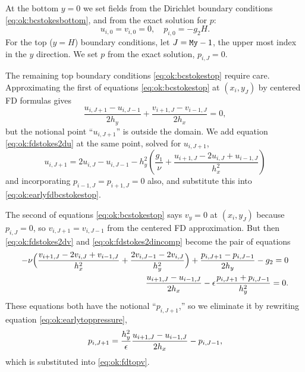 At the bottom $y=0$ we set fields from the Dirichlet boundary conditions \eqref{eq:ok:bcstokesbottom}, and from the exact solution for $p$:
\begin{equation}
  u_{i,0} = v_{i,0} = 0, \quad p_{i,0} = - g_2 H. \label{eq:ok:fdbcstokesbottom}
\end{equation}
For the top ($y=H$) boundary conditions, let $J=\text{\texttt{My}}-1$, the upper most index in the $y$ direction.  We set $p$ from the exact solution, $p_{i,J} = 0$.

The remaining top boundary conditions \eqref{eq:ok:bcstokestop} require care.  Approximating the first of equations \eqref{eq:ok:bcstokestop} at $(x_i,y_J)$ by centered FD formulas gives
\begin{equation}
  \frac{u_{i,J+1}-u_{i,J-1}}{2h_y} + \frac{v_{i+1,J}-v_{i-1,J}}{2h_x} = 0, \label{eq:ok:earlyfdbcstokestop}
\end{equation}
but the notional point ``$u_{i,J+1}$'' is outside the domain.  We add equation \eqref{eq:ok:fdstokes2du} at the same point, solved for $u_{i,J+1}$,
\begin{equation}
  u_{i,J+1} = 2 u_{i,J} - u_{i,J-1} - h_y^2 \left(\frac{g_1}{\nu} + \frac{u_{i+1,J} - 2 u_{i,J} + u_{i-1,J}}{h_x^2}\right) \label{eq:ok:earlyfdstokes2dutop} 
\end{equation}
and incorporating $p_{i-1,J}=p_{i+1,J}=0$ also, and substitute this into \eqref{eq:ok:earlyfdbcstokestop}.

The second of equations \eqref{eq:ok:bcstokestop} says $v_y=0$ at $(x_i,y_J)$ because $p_{i,J}=0$, so $v_{i,J+1} = v_{i,J-1}$ from the centered FD approximation.  But then \eqref{eq:ok:fdstokes2dv} and \eqref{eq:ok:fdstokes2dincomp} become the pair of equations
\begin{align}
-\nu \Big(\frac{v_{i+1,J} - 2 v_{i,J} + v_{i-1,J}}{h_x^2} + \frac{2 v_{i,J-1} - 2 v_{i,J}}{h_y^2}\Big) + \frac{p_{i,J+1}-p_{i,J-1}}{2h_y} - g_2 = 0 \label{eq:ok:fdtopv} \\
\frac{u_{i+1,J}-u_{i-1,J}}{2h_x}  - \epsilon \frac{p_{i,J+1} + p_{i,J-1}}{h_y^2} = 0. \label{eq:ok:earlytoppressure}
\end{align}
These equations both have the notional ``$p_{i,J+1}$,'' so we eliminate it by rewriting equation \eqref{eq:ok:earlytoppressure},
\begin{equation}
p_{i,J+1} = \frac{h_y^2}{\epsilon} \frac{u_{i+1,J}-u_{i-1,J}}{2h_x} - p_{i,J-1},\label{eq:ok:fdtoppressureelim}
\end{equation}
which is substituted into \eqref{eq:ok:fdtopv}.

